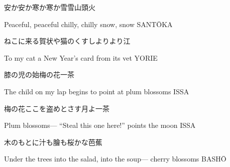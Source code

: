 \begin{haiku}
    {\FH 安か安か寒か寒か雪雪}\hfill{\FH 山頭火}

    \vin{} Peaceful, peaceful
    \vin{} \vin{} chilly, chilly
    \vin{} \vin{} \vin{} snow, snow \hspace{\fill} SANT\={O}KA
\end{haiku}

\begin{haiku}
    {\FH ねこに来る賀状や猫のくすしより}\hfill{\FH より江}

    \vin{} To my cat
    \vin{} \vin{} a New Year's card
    \vin{} \vin{} \vin{} from its vet \hspace{\fill} YORIE
\end{haiku}

\begin{haiku}
    {\FH 膝の児の始梅の花}\hfill{\FH 一茶}

    \vin{} The child on my lap
    \vin{} \vin{} begins to point at
    \vin{} \vin{} \vin{} plum blossoms \hspace{\fill} ISSA
\end{haiku}

\begin{haiku}
    {\FH 梅の花ここを盗めとさす月よ}\hfill{\FH 一茶}

    \vin{} Plum blossoms---
    \vin{} \vin{} ``Steal this one here!''
    \vin{} \vin{} \vin{} points the moon \hspace{\fill} ISSA
\end{haiku}

\begin{haiku}
    {\FH 木のもとに汁も膾も桜かな}\hfill{\FH 芭蕉}

    \vin{} Under the trees
    \vin{} \vin{} into the salad, into the soup---
    \vin{} \vin{} \vin{} cherry blossoms \hspace{\fill} BASH\={O}
\end{haiku}
